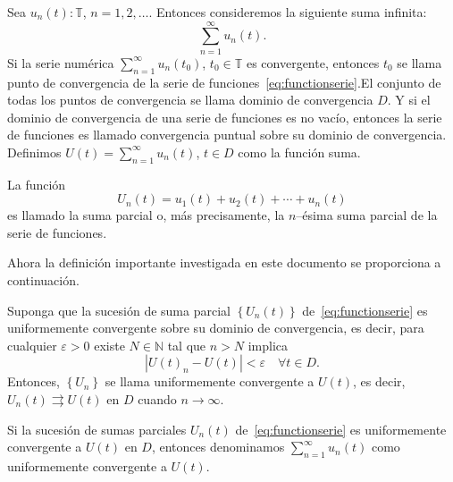 Sea $u_{n}\left(t\right)\colon\mathds{T}$, $n=1,2,\ldots$. Entonces consideremos la siguiente suma infinita:
\begin{equation}\label{eq:functionserie}
\sum_{n=1}^{\infty}u_{n}\left(t\right).
\end{equation}
Si la serie numérica $\sum_{n=1}^{\infty}u_{n}\left(t_{0}\right)$, $t_{0}\in\mathds{T}$ es convergente, entonces $t_{0}$ se llama punto de convergencia de la serie de funciones~\eqref{eq:functionserie}.El conjunto de todas los puntos de convergencia se llama dominio de convergencia $D$. Y si el dominio de convergencia de una serie de funciones es no vacío, entonces la serie de funciones es llamado convergencia puntual sobre su dominio de convergencia. Definimos $U\left(t\right)=\sum_{n=1}^{\infty}u_{n}\left(t\right)$, $t\in D$ como la función suma.
\begin{definition}\label{def:partialsum}
	La función \[ U_{n}\left(t\right)=u_{1}\left(t\right)+u_{2}\left(t\right)+\cdots+u_{n}\left(t\right) \] es llamado la suma parcial o, más precisamente, la $n$--ésima suma parcial de la serie de funciones.
\end{definition}
Ahora la definición importante investigada en este documento se proporciona a continuación.
\begin{definition}\label{def:2}
	Suponga que la sucesión de suma parcial $\left\{U_{n}\left(t\right)\right\}$ de~\eqref{eq:functionserie} es uniformemente convergente sobre su dominio de convergencia, es decir, para cualquier $\varepsilon>0$ existe $N\in\mathds{N}$ tal que $n>N$ implica \[ \left|{U\left(t\right)}_{n}-U\left(t\right)\right|<\varepsilon\quad\forall t\in D. \] Entonces, $\left\{U_{n}\right\}$ se llama uniformemente convergente a $U\left(t\right)$, es decir, $U_{n}\left(t\right)\rightrightarrows U\left(t\right)$ en $D$ cuando $n\to\infty$.
\end{definition}
Si la sucesión de sumas parciales $U_{n}\left(t\right)$ de~\eqref{eq:functionserie} es uniformemente convergente a $U\left(t\right)$ en $D$, entonces denominamos $\sum_{n=1}^{\infty}u_{n}\left(t\right)$ como uniformemente convergente a $U\left(t\right)$.

